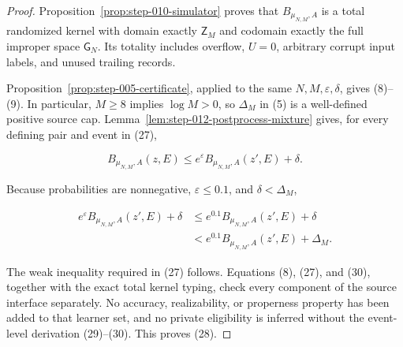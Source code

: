 \begin{proof}
Proposition~\ref{prop:step-010-simulator} proves that
\(B_{\mu_{N,M},A}\) is a total randomized kernel with domain exactly
\(\mathsf Z_M\) and codomain exactly the full improper space
\(\mathsf G_N\).  Its totality includes overflow, \(U=0\), arbitrary
corrupt input labels, and unused trailing records.

Proposition~\ref{prop:step-005-certificate}, applied to the same
\(N,M,\varepsilon,\delta\), gives (8)--(9).  In particular, \(M\ge8\)
implies \(\log M>0\), so \(\Delta_M\) in (5) is a well-defined positive
source cap.  Lemma~\ref{lem:step-012-postprocess-mixture} gives, for every
defining pair and event in (27),

\[
  B_{\mu_{N,M},A}(z,E)
  \le e^\varepsilon B_{\mu_{N,M},A}(z',E)+\delta.
\tag{29}
\]

Because probabilities are nonnegative, \(\varepsilon\le0.1\), and
\(\delta<\Delta_M\),

\[
\begin{aligned}
  e^\varepsilon B_{\mu_{N,M},A}(z',E)+\delta
  &\le e^{0.1}B_{\mu_{N,M},A}(z',E)+\delta\\
  &< e^{0.1}B_{\mu_{N,M},A}(z',E)+\Delta_M.
\end{aligned}
\tag{30}
\]

The weak inequality required in (27) follows.  Equations (8), (27), and
(30), together with the exact total kernel typing, check every component
of the source interface separately.  No accuracy, realizability, or
properness property has been added to that learner set, and no private
eligibility is inferred without the event-level derivation (29)--(30).
This proves (28). \end{proof}

